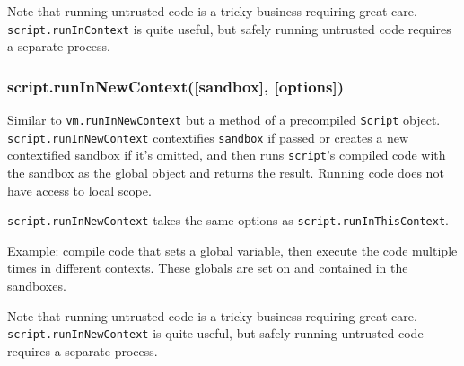 Note that running untrusted code is a tricky business requiring great
care. \texttt{script.runInContext} is quite useful, but safely running
untrusted code requires a separate process.

\subsubsection{script.runInNewContext({[}sandbox{]}, {[}options{]})}

Similar to \texttt{vm.runInNewContext} but a method of a precompiled
\texttt{Script} object. \texttt{script.runInNewContext} contextifies
\texttt{sandbox} if passed or creates a new contextified sandbox if it's
omitted, and then runs \texttt{script}'s compiled code with the sandbox
as the global object and returns the result. Running code does not have
access to local scope.

\texttt{script.runInNewContext} takes the same options as
\texttt{script.runInThisContext}.

Example: compile code that sets a global variable, then execute the code
multiple times in different contexts. These globals are set on and
contained in the sandboxes.

\begin{Shaded}
\begin{Highlighting}[]
 \NormalTok{);}
 \NormalTok{);}

 

  \NormalTok{(}\NormalTok{);}

\NormalTok{(} 
\NormalTok{\});}

\NormalTok{(}

\end{Highlighting}
\end{Shaded}

Note that running untrusted code is a tricky business requiring great
care. \texttt{script.runInNewContext} is quite useful, but safely
running untrusted code requires a separate process.
